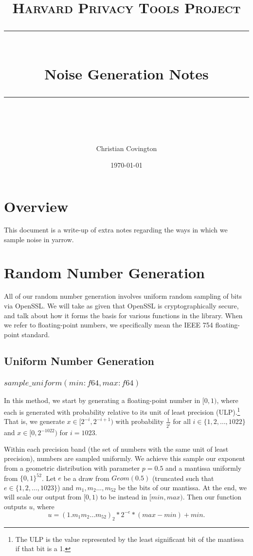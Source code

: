\documentclass[11pt]{scrartcl} %
\title{
	\normalfont\normalsize
	\textsc{Harvard Privacy Tools Project}\\ %
	\vspace{25pt} %
	\rule{\linewidth}{0.5pt}\\ %
	\vspace{20pt} %
	{\huge Noise Generation Notes}\\ %
	\vspace{12pt} %
	\rule{\linewidth}{2pt}\\ %
	\vspace{12pt} %
}
\author{\LARGE Christian Covington} %
\date{\normalsize\today} %
\begin{document}
\maketitle

\section{Overview}
This document is a write-up of extra notes regarding the ways in which we sample noise in yarrow.

\section{Random Number Generation}
All of our random number generation involves uniform random sampling of bits via OpenSSL.
We will take as given that OpenSSL is cryptographically secure, and talk about how it
forms the basis for various functions in the library.
When we refer to floating-point numbers, we specifically mean the IEEE 754 floating-point standard.

\subsection{Uniform Number Generation}

\subsubsection{$sample\_uniform(min: f64, max: f64)$}
In this method, we start by generating a floating-point number in $[0,1)$,
where each is generated with probability relative to its unit of least precision (ULP).\footnote{The ULP is the value
represented by the least significant bit of the mantissa if that bit is a 1.}
That is, we generate $x \in [2^{-i}, 2^{-i+1})$ with probability $\frac{1}{2^i}$
for all $i \in \{1,2,\hdots,1022\}$ and $x \in [0, 2^{-1022})$ for $i = 1023$.

Within each precision band (the set of numbers with the same unit
of least precision), numbers are sampled uniformly.
We achieve this sample our exponent from a geometric distribution with parameter $p = 0.5$ and a mantissa uniformly from $\{0,1\}^{52}$.
Let $e$ be a draw from $Geom(0.5)$ (truncated such that $e \in \{1,2,\hdots,1023\}$) and $m_1, m_2 \hdots, m_{52}$ be the bits of our mantissa.
At the end, we will scale our output from $[0,1)$ to be instead in $[min, max)$. Then our function outputs $u$, where
\[ u = (1.m_1m_2 \hdots m_{52})_2 * 2^{-e} * (max - min) + min. \]
\end{document}
